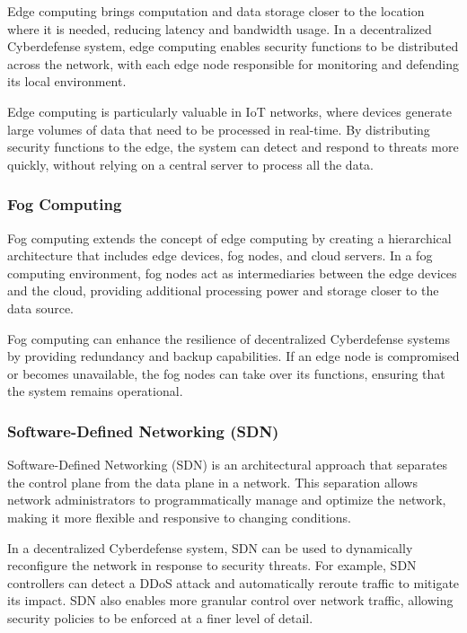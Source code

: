 Edge computing brings computation and data storage closer to the location where it is needed, reducing latency and bandwidth usage. In a decentralized Cyberdefense system, edge computing enables security functions to be distributed across the network, with each edge node responsible for monitoring and defending its local environment.

Edge computing is particularly valuable in IoT networks, where devices generate large volumes of data that need to be processed in real-time. By distributing security functions to the edge, the system can detect and respond to threats more quickly, without relying on a central server to process all the data.

\subsubsection{Fog Computing}

Fog computing extends the concept of edge computing by creating a hierarchical architecture that includes edge devices, fog nodes, and cloud servers. In a fog computing environment, fog nodes act as intermediaries between the edge devices and the cloud, providing additional processing power and storage closer to the data source.

Fog computing can enhance the resilience of decentralized Cyberdefense systems by providing redundancy and backup capabilities. If an edge node is compromised or becomes unavailable, the fog nodes can take over its functions, ensuring that the system remains operational.

\subsubsection{Software-Defined Networking (SDN)}

Software-Defined Networking (SDN) is an architectural approach that separates the control plane from the data plane in a network. This separation allows network administrators to programmatically manage and optimize the network, making it more flexible and responsive to changing conditions.

In a decentralized Cyberdefense system, SDN can be used to dynamically reconfigure the network in response to security threats. For example, SDN controllers can detect a DDoS attack and automatically reroute traffic to mitigate its impact. SDN also enables more granular control over network traffic, allowing security policies to be enforced at a finer level of detail.

